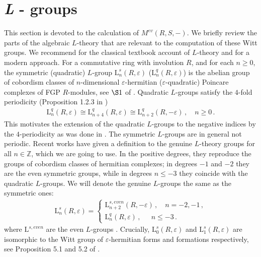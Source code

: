 \documentclass[sn-mathphys-num]{sn-jnl}
\theoremstyle{definition}
\numberwithin{equation}{section}
\theoremstyle{definition}
\def\L{{\mbox{L}}}
\def\ep{\varepsilon}
\def\IZ{{\mathbb{Z}}}
\begin{document}
\section{\textit{L} - groups}\label{sec:L-groups}

This section is devoted to the calculation of $M^{ev}(R,S,-)$. We briefly review the parts of the algebraic $L$-theory that are relevant to the computation of these Witt groups.  We recommend \cite{Ranicki1981ExactSI,ranicki1992algebraic} for the classical textbook account of $L$-theory and \cite{calmes2020hermitian1,calmès2025hermitian2,calmes2020hermitian3} for a modern approach. For a commutative ring with involution $R$, and for each $n\geqslant 0$, the symmetric (quadratic) $L$-group $\L^{s}_n(R,\ep)$ ($
\L^{q}_n(R,\ep)$) is the abelian  group of cobordism classes of $n$-dimensional $\ep$-hermitian ($\ep$-quadratic) Poincare complexes of FGP $R$-modules, see $\S1$ of \cite{Ranicki1981ExactSI}. Quadratic $L$-groups satisfy the $4$-fold periodicity (Proposition 1.2.3 in \cite{Ranicki1981ExactSI})
\begin{align}
   \L^{q}_n(R,\ep)\cong \L_{n+4}^q(R,\ep)\cong \L_{n+2}^q(R,-\ep)\,,\quad n\geqslant0\,.
\end{align}
This motivates the extension of the quadratic $L$-groups to the negative indices by the $4$-periodicity as was done in \cite{RanickiAlgThofSurgery1}. The symmetric $L$-groups are in general not periodic. Recent works \cite{calmes2020hermitian1,calmès2025hermitian2,calmes2020hermitian3} have given a definition to the genuine $L$-theory groups for all $n\in \IZ$, which we are going to use. In the positive degrees, they reproduce the groups of cobordism classes of hermitian complexes; in degrees $-1$ and $-2$ they are the even symmetric groups, while in degrees $n\leqslant-3$ they coincide with the quadratic $L$-groups. We will denote the genuine $L$-groups the same as the symmetric ones: 
\begin{align}\label{eq:SymLTh}
    \L^s_n(R,\ep)=\begin{cases}
       \L^{s,even}_{n+2}(R,-\ep)\,,\quad n=-2,-1\,,\\
        \L^q_{n}(R,\ep)\,,\quad \;\, n\leqslant -3\,.
    \end{cases}
\end{align}
where $\L^{s,even}$ are the even $L$-groups \cite{RanickiAlgThofSurgery1}.
 Crucially, $\L_0^s(R,\ep)$ and $\L^s_1(R,\ep)$ are isomorphic to the Witt group of $\ep$-hermitian forms and formations respectively, see Proposition 5.1 and 5.2 of \cite{RanickiAlgThofSurgery1}.  
\end{document}
